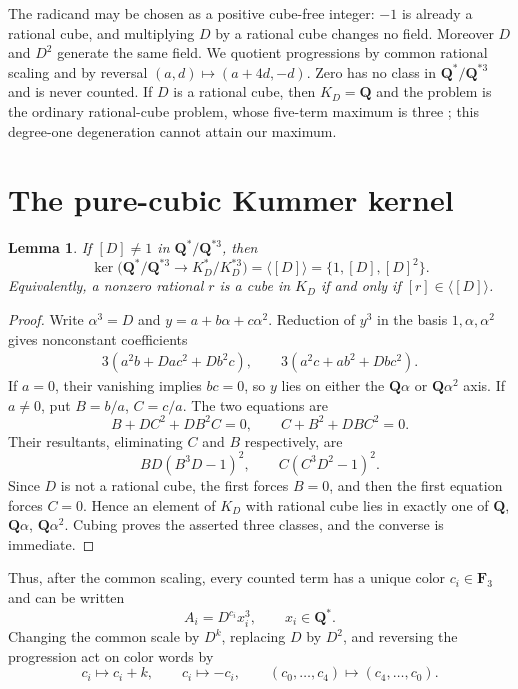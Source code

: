 \documentclass[10pt]{article}
\newtheorem{lemma}[theorem]{Lemma}
\newcommand{\Q}{\mathbf Q}
\newcommand{\F}{\mathbf F}
\begin{document}
The radicand may be chosen as a positive cube-free integer: $-1$ is already
a rational cube, and multiplying $D$ by a rational cube changes no field.
Moreover $D$ and $D^2$ generate the same field.  We quotient progressions by
common rational scaling and by reversal
$(a,d)\mapsto(a+4d,-d)$.  Zero has no class in $\Q^*/\Q^{*3}$ and is never
counted.  If $D$ is a rational cube, then $K_D=\Q$ and the problem is the
ordinary rational-cube problem, whose five-term maximum is three
\cite{HT}; this degree-one degeneration cannot attain our maximum.

\section{The pure-cubic Kummer kernel}
\begin{lemma}\label{lem:kernel}
If $[D]\ne1$ in $\Q^*/\Q^{*3}$, then
\[
\ker\bigl(\Q^*/\Q^{*3}\longrightarrow K_D^*/K_D^{*3}\bigr)
=\langle[D]\rangle=\{1,[D],[D]^2\}.
\]
Equivalently, a nonzero rational $r$ is a cube in $K_D$ if and only if
$[r]\in\langle[D]\rangle$.
\end{lemma}
\begin{proof}
Write $\alpha^3=D$ and $y=a+b\alpha+c\alpha^2$.  Reduction of $y^3$ in the
basis $1,\alpha,\alpha^2$ gives nonconstant coefficients
\begin{align*}
3(a^2b+Da c^2+Db^2c),\qquad
3(a^2c+ab^2+Dbc^2).
\end{align*}
If $a=0$, their vanishing implies $bc=0$, so $y$ lies on either the
$\Q\alpha$ or $\Q\alpha^2$ axis.  If $a\ne0$, put $B=b/a$, $C=c/a$.  The two
equations are
\[
B+DC^2+DB^2C=0,\qquad C+B^2+DBC^2=0.
\]
Their resultants, eliminating $C$ and $B$ respectively, are
\[
BD(B^3D-1)^2,\qquad C(C^3D^2-1)^2.
\]
Since $D$ is not a rational cube, the first forces $B=0$, and then the first
equation forces $C=0$.  Hence an element of $K_D$ with rational cube lies in
exactly one of $\Q$, $\Q\alpha$, $\Q\alpha^2$.  Cubing proves the asserted
three classes, and the converse is immediate.
\end{proof}

Thus, after the common scaling, every counted term has a unique color
$c_i\in\F_3$ and can be written
\begin{equation}\label{eq:colors}
A_i=D^{c_i}x_i^3,\qquad x_i\in\Q^*.
\end{equation}
Changing the common scale by $D^k$, replacing $D$ by $D^2$, and reversing
the progression act on color words by
\[
c_i\mapsto c_i+k,\qquad c_i\mapsto-c_i,\qquad
(c_0,\ldots,c_4)\mapsto(c_4,\ldots,c_0).
\]
\end{document}
